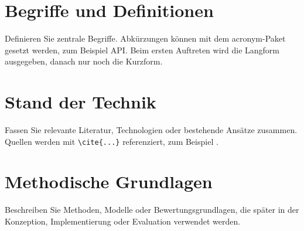 
\section{Begriffe und Definitionen}

Definieren Sie zentrale Begriffe. Abkürzungen können mit dem acronym-Paket
gesetzt werden, zum Beispiel \ac{API}. Beim ersten Auftreten wird die Langform
ausgegeben, danach nur noch die Kurzform.

\section{Stand der Technik}

Fassen Sie relevante Literatur, Technologien oder bestehende Ansätze zusammen.
Quellen werden mit \verb|\cite{...}| referenziert, zum Beispiel
\cite{example-source}.

\section{Methodische Grundlagen}

Beschreiben Sie Methoden, Modelle oder Bewertungsgrundlagen, die später in der
Konzeption, Implementierung oder Evaluation verwendet werden.

